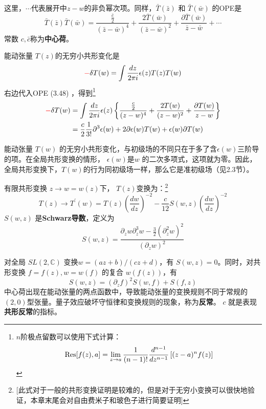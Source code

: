 这里，$\cdots$代表展开中$ z-w $的非负幂次项。同样，$ \bar{T}(\bar{z})$ 和 $\bar{T}(\bar{w})$ 的OPE是
\begin{equation}
	\bar{T}(\bar{z}) \bar{T}(\bar{w})=\frac{\frac{\bar{c}}{2}}{(\bar{z}-\bar{w})^{4}}+\frac{2 \bar{T}(\bar{w})}{(\bar{z}-\bar{w})^{2}}+\frac{\partial \bar{T}(\bar{w})}{\bar{z}-\bar{w}}+\cdots
\end{equation}
常数 $c,\bar{c} $称为\textbf{中心荷}。

能动张量 $T(z) $的无穷小共形变化是
\begin{equation}
	{\color{red}-}\delta T(w)=\int \frac{d z}{2 \pi i} \epsilon(z) T(z) T(w)
\end{equation}
右边代入OPE (3.48) ，得到\footnote{$n$阶极点留数可以使用下式计算：\[\Res[f(z),a]=\lim_{z\to a}\frac{1}{(n-1)!}\frac{d^{n-1}}{dz^{n-1}}\left[(z-a)^nf(z)\right]\]}
\begin{equation}
	\begin{aligned} {\color{red}-}\delta T(w) &=\int \frac{d z}{2 \pi i} \epsilon(z)\left\{\frac{\frac{c}{2}}{(z-w)^{4}}+\frac{2 T(w)}{(z-w)^{2}}+\frac{\partial T(w)}{z-w}\right\} \\ &=\frac{c}{2} \frac{1}{3 !} \partial^{3} \epsilon(w)+2 \partial \epsilon(w) T(w)+\epsilon(w) \partial T(w) \end{aligned}
\end{equation}

能动张量 $T(w)$ 的无穷小共形变化，与初级场的不同只在于多了含$ \epsilon(w) $三阶导的项。在全局共形变换的情形， $\epsilon(w) $是$ w$ 的二次多项式，这项就为零。因此，全局共形变换下，$ T(w) $的行为同初级场一样，那么它是准初级场（见2.3节）。

有限共形变换 $z \rightarrow w=w(z) $下， $T(z) $变换为：\footnote{[此式对于一般的共形变换证明是较难的，但是对于无穷小变换可以很快地验证，本章末尾会对自由费米子和玻色子进行简要证明]}
\begin{equation}
	T(z) \rightarrow T^{\prime}(w)=T(z)\left(\frac{d w}{d z}\right)^{-2}-\frac{c}{12} S(w, z)\left(\frac{d w}{d z}\right)^{-2}
\end{equation}
$S(w,z)$ 是\textbf{Schwarz导数}，定义为
\begin{equation}
	S(w, z)=\frac{\partial_{z} w \partial_{z}^{3} w-\frac{3}{2}\left(\partial_{z}^{2} w\right)^{2}}{\left(\partial_{z} w\right)^{2}}
\end{equation}

对全局 $SL(2,\mathbb{C})$ 变换$ w=(az+b)/(cz+d) $，有 $S(w,z)=0 $。同时，对共形变换 $f=f(z),w=w(f)$ 的复合 $w(f(z)) $，有
\begin{equation}
	S(w, z)=\left(\partial_{z} f\right)^{2} S(w, f)+S(f, z)
\end{equation}
中心荷出现在能动张量的两点函数中，导致能动张量的变换规则不同于常规的 $(2,0) $型张量。量子效应破坏守恒律和变换规则的现象，称为\textbf{反常}。 $c$ 就是表现\textbf{共形反常}的指标。

